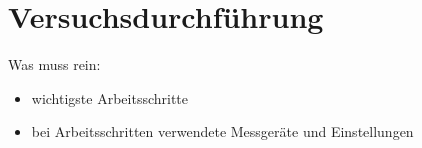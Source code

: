 \section{Versuchsdurchführung}
\label{section:Versuchsdurchführung}
Was muss rein:
\begin{itemize}
    \item wichtigste Arbeitsschritte
    \item bei Arbeitsschritten verwendete Messgeräte und Einstellungen
\end{itemize}


